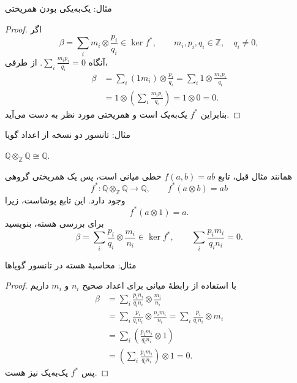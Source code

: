 \begin{frame}[t]{مثال: یک‌به‌یکی بودن همریختی}
    \label{lec19:z-tensor-q-kernel}
    \begin{proof}
    اگر
    \[
        \beta=\sum_i m_i\otimes\frac{p_i}{q_i}\in\ker f^*,
        \qquad m_i,p_i,q_i\in\mathbb Z,\quad q_i\ne0,
    \]
    آنگاه $\sum_i\frac{m_ip_i}{q_i}=0$. از طرفی،
    \[
    \begin{aligned}
        \beta
        &=\sum_i(1m_i)\otimes\frac{p_i}{q_i}
          =\sum_i1\otimes\frac{m_ip_i}{q_i}\\
        &=1\otimes\left(\sum_i\frac{m_ip_i}{q_i}\right)
          =1\otimes0=0.
    \end{aligned}
    \]
    بنابراین $f^*$ یک‌به‌یک است و همریختی مورد نظر به دست می‌آید.
    \end{proof}
\end{frame}

\begin{frame}[t]{مثال: تانسور دو نسخه از اعداد گویا}
    \label{lec19:q-tensor-q-map}
    \begin{example}
        $\mathbb Q\otimes_{\mathbb Z}\mathbb Q\cong\mathbb Q$.
    \end{example}
    همانند مثال قبل، تابع $f(a,b)=ab$ خطی میانی است، پس یک همریختی گروهی
    \[
        f^*:\mathbb Q\otimes_{\mathbb Z}\mathbb Q\longrightarrow\mathbb Q,
        \qquad f^*(a\otimes b)=ab
    \]
    وجود دارد. این تابع پوشاست، زیرا
    \[
        f^*(a\otimes1)=a.
    \]
    برای بررسی هسته، بنویسید
    \[
        \beta=\sum_i\frac{p_i}{q_i}\otimes\frac{m_i}{n_i}\in\ker f^*,
        \qquad\sum_i\frac{p_im_i}{q_in_i}=0.
    \]
\end{frame}

\begin{frame}[t]{مثال: محاسبهٔ هسته در تانسور گویاها}
    \label{lec19:q-tensor-q-kernel}
    \begin{proof}
    با استفاده از رابطهٔ میانی برای اعداد صحیح $n_i$ و $m_i$ داریم
    \[
    \begin{aligned}
        \beta
        &=\sum_i\frac{p_in_i}{q_in_i}\otimes\frac{m_i}{n_i}\\
        &=\sum_i\frac{p_i}{q_in_i}\otimes\frac{n_im_i}{n_i}
          =\sum_i\frac{p_i}{q_in_i}\otimes m_i\\
        &=\sum_i\left(\frac{p_im_i}{q_in_i}\otimes1\right)\\
        &=\left(\sum_i\frac{p_im_i}{q_in_i}\right)\otimes1=0.
    \end{aligned}
    \]
    پس $f^*$ یک‌به‌یک نیز هست.
    \end{proof}
\end{frame}


